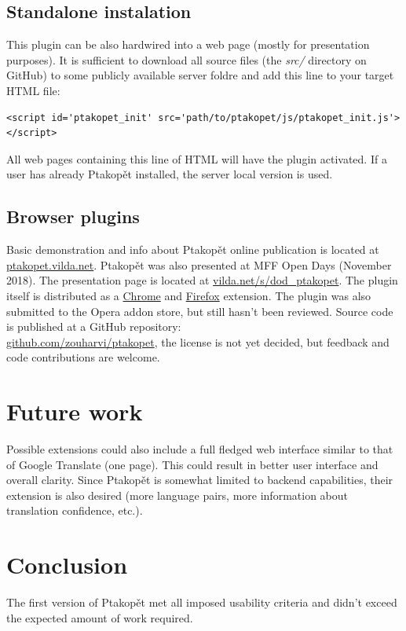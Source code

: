 \documentclass[a4paper]{article}
\begin{document}
\subsection{Standalone instalation}
This plugin can be also hardwired into a web page (mostly for presentation purposes). It is sufficient to download all source files (the \textit{src/} directory on GitHub) to some publicly available server foldre and add this line to your target HTML file: \begin{lstlisting}
<script id='ptakopet_init' src='path/to/ptakopet/js/ptakopet_init.js'></script>
\end{lstlisting}
All web pages containing this line of HTML will have the plugin activated. If a user has already Ptakopět installed, the server local version is used.

\subsection{Browser plugins}
Basic demonstration and info about Ptakopět online publication is located at \href{http://ptakopet.vilda.net}{ptakopet.vilda.net}. Ptakopět was also presented at MFF Open Days (November 2018). The presentation page is located at \href{https://vilda.net/s/dod\_ptakopet}{vilda.net/s/dod\_ptakopet}. The plugin itself is distributed as a \href{https://chrome.google.com/webstore/detail/ptakop\%C4\%9Bt/hgjlgmhmcmcmjiclegnipnaeejpibjmn}{Chrome} and \href{https://addons.mozilla.org/en-US/firefox/addon/ptakop\%C4\%9Bt/}{Firefox} extension. The plugin was also submitted to the Opera addon store, but still hasn't been reviewed.
Source code is published at a GitHub repository:\\ \href{https://github.com/zouharvi/ptakopet}{github.com/zouharvi/ptakopet}, the license is not yet decided, but feedback and code contributions are welcome.

\section{Future work}
Possible extensions could also include a full fledged web interface similar to that of Google Translate (one page). This could result in better user interface and overall clarity. Since Ptakopět is somewhat limited to backend capabilities, their extension is also desired (more language pairs, more information about translation confidence, etc.).

\section{Conclusion}
The first version of Ptakopět met all imposed usability criteria and didn't exceed the expected amount of work required.
\end{document}
